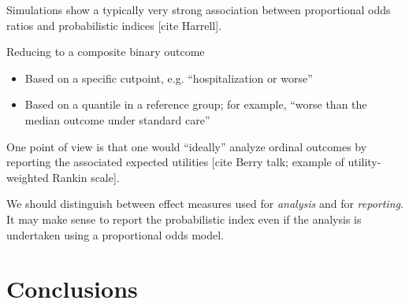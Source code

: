 \documentclass[
  11pt,
  fleqn
]{article}
\begin{document}
Simulations show a typically very strong association between
proportional odds ratios and probabilistic indices [cite Harrell].

Reducing to a composite binary outcome
\begin{itemize}
  \item Based on a specific cutpoint, e.g. ``hospitalization or worse''
  \item Based on a quantile in a reference group; for example,
    ``worse than the median outcome under standard care''
\end{itemize}

One point of view is that one would ``ideally'' analyze ordinal
outcomes by reporting the associated expected utilities [cite Berry
talk; example of utility-weighted Rankin scale].

We should distinguish between effect measures used for
\emph{analysis} and for \emph{reporting}. It may make sense to report
the probabilistic index even if the analysis is undertaken using a
proportional odds model.

\section{Conclusions}
\end{document}
